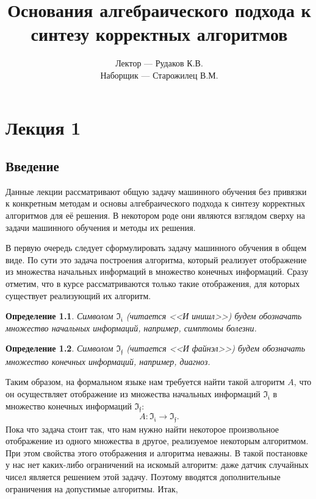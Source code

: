 \documentclass[a4paper, 12pt]{report}
\newtheorem{definition}{Определение}[chapter]
\begin{document}
\title{Основания алгебраического подхода к синтезу корректных алгоритмов}
\author{Лектор --- Рудаков К.В.\\ Наборщик --- Старожилец В.М.}
\date{}
\maketitle

\tableofcontents

\chapter{Лекция 1}
\section{Введение}
Данные лекции рассматривают общую задачу машинного обучения без привязки к конкретным методам и основы алгебраического подхода к синтезу корректных алгоритмов для её решения. В некотором роде они являются взглядом сверху на задачи машинного обучения и методы их решения.

В первую очередь следует сформулировать задачу машинного обучения в общем виде. По сути это задача построения алгоритма, который реализует отображение из множества начальных информаций в множество конечных информаций. Сразу отметим, что в курсе рассматриваются только такие отображения, для которых существует реализующий их алгоритм.

\begin{definition}
Символом $\mathfrak{I_i}$ (читается <<И инишл>>) будем обозначать множество начальных информаций, например, симптомы болезни.
\end{definition}

\begin{definition}
Символом $\mathfrak{I_f}$ (читается <<И файнэл>>) будем обозначать множество конечных информаций, например, диагноз.
\end{definition}

Таким образом, на формальном языке нам требуется найти такой алгоритм $A$, что он осуществляет отображение из множества начальных информаций $\mathfrak{I_i}$ в множество конечных информаций $\mathfrak{I_f}$:
\[
A: \mathfrak{I_i} \rightarrow \mathfrak{I_f}.
\]
Пока что задача стоит так, что нам нужно найти некоторое произвольное отображение из одного множества в другое, реализуемое некоторым алгоритмом. При этом свойства этого отображения и алгоритма неважны. В такой постановке у нас нет каких-либо ограничений на искомый алгоритм: даже датчик случайных чисел является решением этой задачу. Поэтому вводятся дополнительные ограничения на допустимые алгоритмы. Итак,
\end{document}
